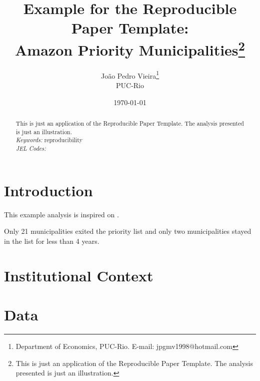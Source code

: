 \documentclass[12pt, a4paper, hidelinks]{article}
\begin{document}
\begin{titlepage}
\title{\Large \textbf{Example for the Reproducible Paper Template:}\\ \large \textbf{Amazon Priority Municipalities}\thanks{This is just an application of the Reproducible Paper Template. The analysis presented is just an illustration.}}
\author{João Pedro Vieira\thanks{Department of Economics, PUC-Rio. E-mail: jpgmv1998@hotmail.com} \\ \large PUC-Rio}
\date{\today}

\maketitle

\begin{abstract}
\noindent This is just an application of the Reproducible Paper Template. The analysis presented is just an illustration.  \\ %


\noindent\textit{Keywords:} reproducibility \\
\noindent\textit{JEL Codes:} \\
\end{abstract}
\setcounter{page}{0}
\thispagestyle{empty}
\end{titlepage}
\pagebreak \newpage

\section{Introduction} \label{sec:introduction}

This example analysis is inspired on \citep{assunccao2019getting}.

Only 21 municipalities exited the priority list and only two municipalities stayed in the list for less than 4 years.

\setlength{\parskip}{0.5em} %

\section{Institutional Context} \label{sec:institutional}

\section{Data} \label{sec:data}
\end{document}
